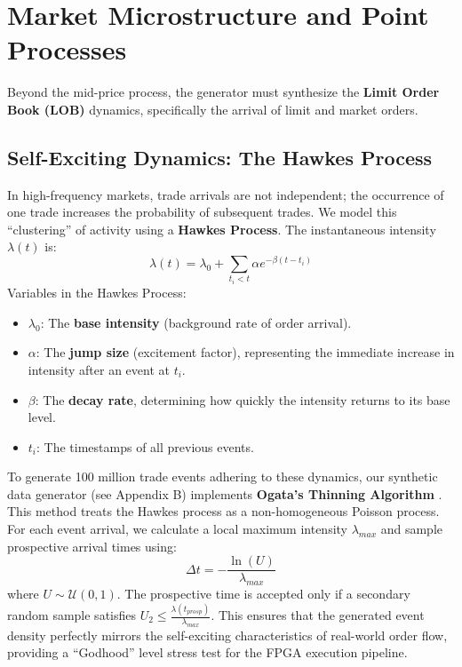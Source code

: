 \section{Market Microstructure and Point Processes}
Beyond the mid-price process, the generator must synthesize the \textbf{Limit Order Book (LOB)} dynamics, specifically the arrival of limit and market orders.

\subsection{Self-Exciting Dynamics: The Hawkes Process}
In high-frequency markets, trade arrivals are not independent; the occurrence of one trade increases the probability of subsequent trades. We model this ``clustering'' of activity using a \textbf{Hawkes Process}. The instantaneous intensity $\lambda(t)$ is:
\begin{equation}
    \lambda(t) = \lambda_0 + \sum_{t_i < t} \alpha e^{-\beta(t - t_i)}
\end{equation}
Variables in the Hawkes Process:
\begin{itemize}
    \item $\lambda_0$: The \textbf{base intensity} (background rate of order arrival).
    \item $\alpha$: The \textbf{jump size} (excitement factor), representing the immediate increase in intensity after an event at $t_i$.
    \item $\beta$: The \textbf{decay rate}, determining how quickly the intensity returns to its base level.
    \item $t_i$: The timestamps of all previous events.
\end{itemize}

To generate 100 million trade events adhering to these dynamics, our synthetic data generator (see Appendix B) implements \textbf{Ogata’s Thinning Algorithm} \citep{Ogata1981}. This method treats the Hawkes process as a non-homogeneous Poisson process. For each event arrival, we calculate a local maximum intensity $\lambda_{max}$ and sample prospective arrival times using:
\begin{equation}
    \Delta t = -\frac{\ln(U)}{\lambda_{max}}
\end{equation}
where $U \sim \mathcal{U}(0,1)$. The prospective time is accepted only if a secondary random sample satisfies $U_2 \leq \frac{\lambda(t_{prosp})}{\lambda_{max}}$. This ensures that the generated event density perfectly mirrors the self-exciting characteristics of real-world order flow, providing a ``Godhood'' level stress test for the FPGA execution pipeline.

